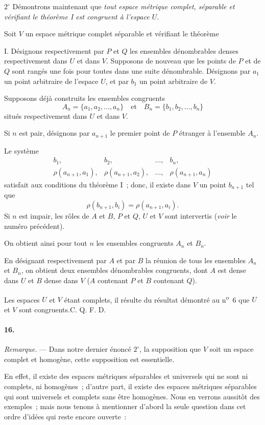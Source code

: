 \documentclass[a4paper,12pt]{amsart}
\newcommand{\srcpage}[1]{} %
\begin{document}
$2^\circ$ Démontrons maintenant que \textit{tout espace métrique complet, séparable et vérifiant le théorème I est congruent à l'espace $U$}.

Soit $V$ un espace métrique complet séparable et vérifiant le théorème
\srcpage{78}
I. Désignons respectivement par $P$ et $Q$ les ensembles dénombrables denses respectivement dans $U$ et dans $V$. Supposons de nouveau que les points de $P$ et de $Q$ sont rangés une fois pour toutes dans une suite dénombrable. Désignons par $a_1$ un point arbitraire de l'espace $U$, et par $b_1$ un point arbitraire de $V$.

Supposons déjà construits les ensembles congruents
\[
A_n=\{a_1,a_2,\dots,a_n\}\quad\text{et}\quad B_n=\{b_1,b_2,\dots,b_n\}
\]
situés respectivement dans $U$ et dans $V$.

Si $n$ est pair, désignons par $a_{n+1}$ le premier point de $P$ étranger à l'ensemble $A_n$.

Le système
\[
\begin{array}{cccc}
b_1,&b_2,&\dots,&b_n,\\
\rho(a_{n+1},a_1),&\rho(a_{n+1},a_2),&\dots,&\rho(a_{n+1},a_n)
\end{array}
\]
satisfait aux conditions du théorème I~; donc, il existe dans $V$ un point $b_{n+1}$ tel que
\[
\rho(b_{n+1},b_i)=\rho(a_{n+1},a_i).
\]
Si $n$ est impair, les rôles de $A$ et $B$, $P$ et $Q$, $U$ et $V$ sont intervertis (\textit{voir} le numéro précédent).

On obtient ainsi pour tout $n$ les ensembles congruents $A_n$ et $B_n$.

En désignant respectivement par $A$ et par $B$ la réunion de tous les ensembles $A_n$ et $B_n$, on obtient deux ensembles dénombrables congruents, dont $A$ est dense dans $U$ et $B$ dense dans $V$ ($A$ contenant $P$ et $B$ contenant $Q$).

Les espaces $U$ et $V$ étant complets, il résulte du résultat démontré au n\textsuperscript{o}~6 que $U$ et $V$ sont congruents.\hfill C. Q. F. D.

\paragraph{16.}
\textit{Remarque.} --- Dans notre dernier énoncé $2^\circ$, la supposition que $V$ soit un espace complet et homogène, cette supposition est essentielle.

En effet, il existe des espaces métriques séparables et universels qui ne sont ni complets, ni homogènes~; d'autre part, il existe des espaces métriques séparables qui sont universels et complets sans être homogènes. Nous en verrons aussitôt des exemples~; mais nous tenons à mentionner d'abord la seule question dans cet ordre d'idées qui reste encore ouverte~:
\srcpage{79}
\end{document}
